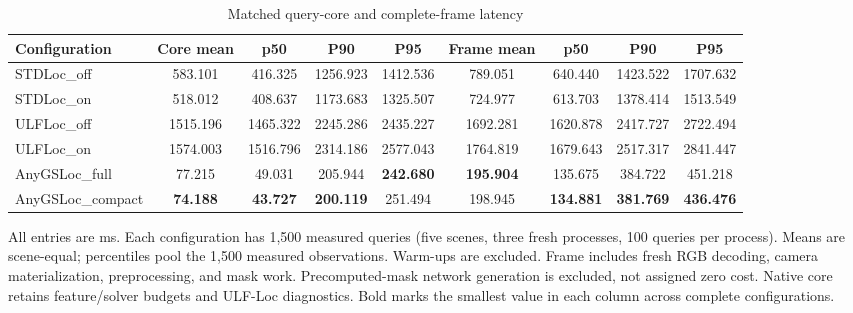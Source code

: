 \begin{table}[tp]
\centering
\footnotesize
\setlength{\tabcolsep}{4pt}
\renewcommand{\arraystretch}{1.12}
\caption{Matched query-core and complete-frame latency}
\label{tab:s_timing}
\begin{tabular}{lcccccccc}
\toprule
Configuration & Core mean & p50 & P90 & P95 & Frame mean & p50 & P90 & P95 \\
\midrule
STDLoc\_off & 583.101 & 416.325 & 1256.923 & 1412.536 & 789.051 & 640.440 & 1423.522 & 1707.632 \\
STDLoc\_on & 518.012 & 408.637 & 1173.683 & 1325.507 & 724.977 & 613.703 & 1378.414 & 1513.549 \\
ULFLoc\_off & 1515.196 & 1465.322 & 2245.286 & 2435.227 & 1692.281 & 1620.878 & 2417.727 & 2722.494 \\
ULFLoc\_on & 1574.003 & 1516.796 & 2314.186 & 2577.043 & 1764.819 & 1679.643 & 2517.317 & 2841.447 \\
AnyGSLoc\_full & 77.215 & 49.031 & 205.944 & \textbf{242.680} & \textbf{195.904} & 135.675 & 384.722 & 451.218 \\
AnyGSLoc\_compact & \textbf{74.188} & \textbf{43.727} & \textbf{200.119} & 251.494 & 198.945 & \textbf{134.881} & \textbf{381.769} & \textbf{436.476} \\
\bottomrule
\end{tabular}
\par\smallskip\begin{minipage}{0.98\linewidth}\footnotesize All entries are ms. Each configuration has 1,500 measured queries (five scenes, three fresh processes, 100 queries per process). Means are scene-equal; percentiles pool the 1,500 measured observations. Warm-ups are excluded. Frame includes fresh RGB decoding, camera materialization, preprocessing, and mask work. Precomputed-mask network generation is excluded, not assigned zero cost. Native core retains feature/solver budgets and ULF-Loc diagnostics. Bold marks the smallest value in each column across complete configurations.\end{minipage}
\end{table}
